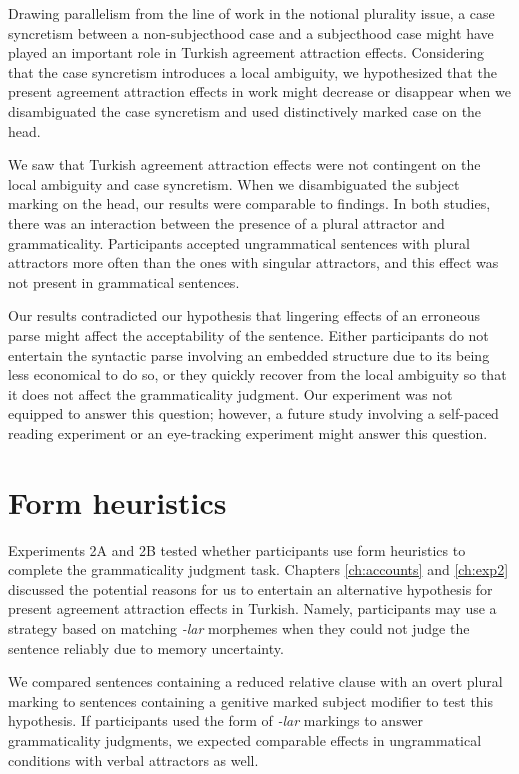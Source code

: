 Drawing parallelism from the line of work in the notional plurality issue, a case syncretism between a non-subjecthood case and a subjecthood case might have played an important role in Turkish agreement attraction effects. Considering that the case syncretism introduces a local ambiguity, we hypothesized that the present agreement attraction effects in \cites{LagoEtAl2019} work might decrease or disappear when we disambiguated the case syncretism and used distinctively marked case on the head.

We saw that Turkish agreement attraction effects were not contingent on the local ambiguity and case syncretism. When we disambiguated the subject marking on the head, our results were comparable to \cites{LagoEtAl2019} findings. In both studies, there was an interaction between the presence of a plural attractor and grammaticality. Participants accepted ungrammatical sentences with plural attractors more often than the ones with singular attractors, and this effect was not present in grammatical sentences. 

Our results contradicted our hypothesis that lingering effects of an erroneous parse might affect the acceptability of the sentence. Either participants do not entertain the syntactic parse involving an embedded structure due to its being less economical to do so, or they quickly recover from the local ambiguity so that it does not affect the grammaticality judgment. Our experiment was not equipped to answer this question; however, a future study involving a self-paced reading experiment or an eye-tracking experiment might answer this question.

\section{Form heuristics} \label{ch6form}

Experiments 2A and 2B tested whether participants use form heuristics to complete the grammaticality judgment task. Chapters \ref{ch:accounts} and \ref{ch:exp2} discussed the potential reasons for us to entertain an alternative hypothesis for present agreement attraction effects in Turkish. Namely, participants may use a strategy based on matching \emph{-lar} morphemes when they could not judge the sentence reliably due to memory uncertainty. 

We compared sentences containing a reduced relative clause with an overt plural marking to sentences containing a genitive marked subject modifier to test this hypothesis. If participants used the form of \emph{-lar} markings to answer grammaticality judgments, we expected comparable effects in ungrammatical conditions with verbal attractors as well.

